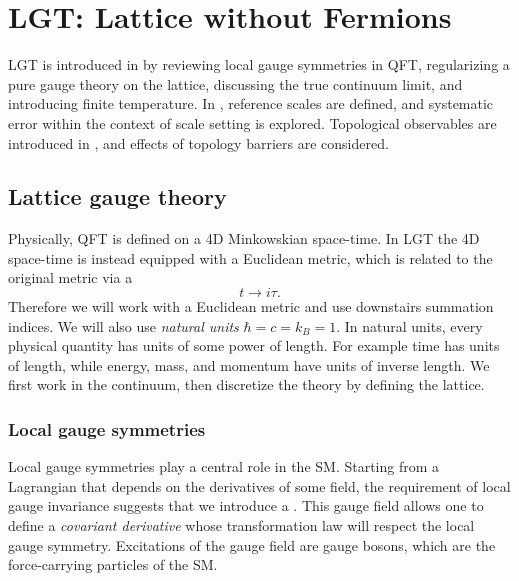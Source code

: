 \chapter{LGT: Lattice without Fermions}\label{ch:preliminaries}

LGT is introduced in 
by reviewing local gauge symmetries in QFT, regularizing a pure
gauge theory on the lattice, discussing the true continuum limit,
and introducing finite temperature. In , 
reference scales are defined, and systematic error within the context
of scale setting is explored. Topological observables are introduced
in , and effects of topology barriers
are considered.

\section{Lattice gauge theory}\label{sec:LGT}

Physically, QFT is defined on a 4D Minkowskian space-time. In LGT 
the 4D space-time is instead equipped with a Euclidean metric, which is 
related to the original metric via a 
\begin{equation}
  t\to i\tau.
\end{equation} 
Therefore we will work with a Euclidean metric
and use downstairs summation indices. 
We will also use {\it natural units}
$\hbar=c=k_B=1$. In natural units, every physical
quantity has units of some power of length. For example
time has units of length, while energy, mass, and momentum
have units of inverse length. 
We first work in the continuum, then 
discretize the theory by defining the lattice.

\subsection{Local gauge symmetries}

Local gauge symmetries play a central role in the SM. 
Starting from a Lagrangian that depends on the derivatives of
some field, the requirement of local gauge invariance suggests that
we introduce a . 
This gauge field allows one to define a {\it covariant derivative} 
 whose transformation law will 
respect the local gauge symmetry.
Excitations of the gauge field are gauge bosons,
which are the force-carrying particles of the SM.

